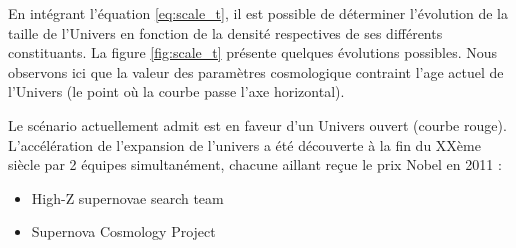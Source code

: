 En intégrant l’équation \ref{eq:scale_t}, il est possible de déterminer l'évolution de la taille de l'Univers en fonction de la densité respectives de ses différents constituants.
La figure \ref{fig:scale_t} présente quelques évolutions possibles.
Nous observons ici que la valeur des paramètres cosmologique contraint l'age actuel de l'Univers (le point où la courbe passe l'axe horizontal).

Le scénario actuellement admit est en faveur d'un Univers ouvert (courbe rouge).
L'accélération de l'expansion de l'univers a été découverte à la fin du XXème siècle par 2 équipes simultanément, chacune aillant reçue le prix Nobel en 2011 :
\begin{itemize}
\item  High-Z supernovae search team \citep{1998AJ....116.1009R} %
\item  Supernova Cosmology Project \citep{1999ApJ...517..565P} %
\end{itemize}

